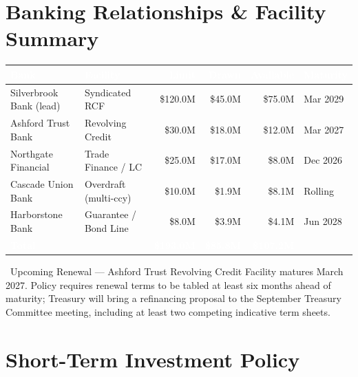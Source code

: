 \documentclass[11pt,a4paper]{scrreprt}
\begin{document}
\section{Banking Relationships \& Facility Summary}

\begin{table}[h!]
\centering
\small
\begin{tabularx}{\textwidth}{@{}Xlrrrl@{}}
\toprule
\rowcolor{treasurynavy}
\textcolor{white}{\bfseries Bank} & \textcolor{white}{\bfseries Facility} &
\textcolor{white}{\bfseries Limit} & \textcolor{white}{\bfseries Drawn} &
\textcolor{white}{\bfseries Available} & \textcolor{white}{\bfseries Maturity} \\
\midrule
Silverbrook Bank (lead)  & Syndicated RCF        & \$120.0M & \$45.0M & \$75.0M & Mar 2029 \\
\rowcolor{treasurygray}
Ashford Trust Bank       & Revolving Credit       & \$30.0M  & \$18.0M & \$12.0M & Mar 2027 \\
Northgate Financial      & Trade Finance / LC     & \$25.0M  & \$17.0M & \$8.0M  & Dec 2026 \\
\rowcolor{treasurygray}
Cascade Union Bank       & Overdraft (multi-ccy)  & \$10.0M  & \$1.9M  & \$8.1M  & Rolling \\
Harborstone Bank         & Guarantee / Bond Line  & \$8.0M   & \$3.9M  & \$4.1M  & Jun 2028 \\
\midrule
\rowcolor{treasuryteal}
\textcolor{white}{\bfseries Total}& & \textcolor{white}{\bfseries \$193.0M} &
\textcolor{white}{\bfseries \$85.8M} & \textcolor{white}{\bfseries \$107.2M} & \\
\bottomrule
\end{tabularx}
\end{table}

\begin{riskbox}{\faCalendar\ Upcoming Renewal --- Ashford Trust Revolving Credit}
Facility matures March 2027. Policy requires renewal terms to be tabled at least six
months ahead of maturity; Treasury will bring a refinancing proposal to the September
Treasury Committee meeting, including at least two competing indicative term sheets.
\end{riskbox}

\section{Short-Term Investment Policy}
\end{document}
